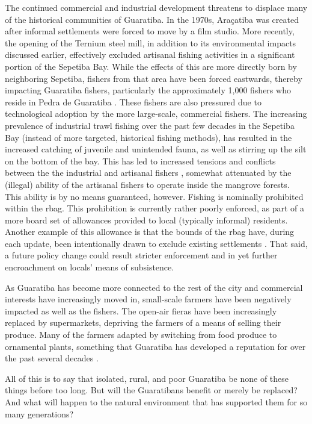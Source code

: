 The continued commercial and industrial development threatens to displace many of the historical communities of Guaratiba. In the 1970s, Araçatiba was created after informal settlements were forced to move by a film studio. More recently, the opening of the Ternium steel mill, in addition to its environmental impacts discussed earlier, effectively excluded artisanal fishing activities in a significant portion of the Sepetiba Bay. While the effects of this are more directly born by neighboring Sepetiba, fishers from that area have been forced eastwards, thereby impacting Guaratiba fishers, particularly the approximately 1,000 fishers who reside in Pedra de Guaratiba \cite{lopesTerritorialidadesEmConflitos2013}. These fishers are also pressured due to technological adoption by the more large-scale, commercial fishers. The increasing prevalence of industrial trawl fishing over the past few decades in the Sepetiba Bay (instead of more targeted, historical fishing methods), has resulted in the increased catching of juvenile and unintended fauna, as well as stirring up the silt on the bottom of the bay. This has led to increased tensions and conflicts between the the industrial and artisanal fishers \cite{begossiMappingSpotsFishing2001}, somewhat attenuated by the (illegal) ability of the artisanal fishers to operate inside the mangrove forests. This ability is by no means guaranteed, however. Fishing is nominally prohibited within the \ac{rbag}. This prohibition is currently rather poorly enforced, as part of a more board set of allowances provided to local (typically informal) residents. Another example of this allowance is that the bounds of the \ac{rbag} have, during each update, been intentionally drawn to exclude existing settlements \cite{castroOSDESAFIOSPLANEJAMENTO2012}. That said, a future policy change could result stricter enforcement and in yet further encroachment on locals’ means of subsistence. 

As Guaratiba has become more connected to the rest of the city and commercial interests have increasingly moved in, small-scale farmers have been negatively impacted as well as the fishers. The open-air fieras have been increasingly replaced by supermarkets, depriving the farmers of a means of selling their produce. Many of the farmers adapted by switching from food produce to ornamental plants, something that Guaratiba has developed a reputation for over the past several decades \cite{fernandesDecodificandoGeografiasPreteritas2010}. 

All of this is to say that isolated, rural, and poor Guaratiba be none of these things before too long. But will the Guaratibans benefit or merely be replaced? And what will happen to the natural environment that has supported them for so many generations?

